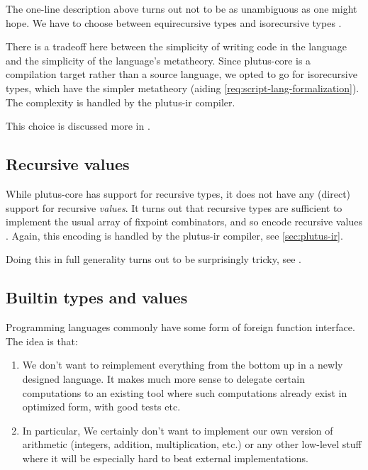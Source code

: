 The one-line description above turns out not to be as unambiguous as one might hope. We have
to choose between equirecursive types and isorecursive types \autocite[chapter 21]{pierce2002types}.

There is a tradeoff here between the simplicity of writing code in the language and the simplicity of the language's metatheory.
Since \gls{plutus-core} is a compilation target rather than a source language, we opted to go for isorecursive types, which have the simpler metatheory (aiding \cref{req:script-lang-formalization}).
The complexity is handled by the \gls{plutus-ir} compiler.

This choice is discussed more in \textcite{plutus-core-spec, peytonjones2019unraveling}.

\subsection{Recursive values}

While \gls{plutus-core} has support for recursive types, it does not have any (direct) support for recursive \emph{values}.
It turns out that recursive types are sufficient to implement the usual array of fixpoint combinators, and so encode recursive values \autocite{harper2012practical}.
Again, this encoding is handled by the \gls{plutus-ir} compiler, see \cref{sec:plutus-ir}.

Doing this in full generality turns out to be surprisingly tricky, see \textcite{peytonjones2019unraveling}.

\subsection{Builtin types and values}

Programming languages commonly have some form of foreign function interface. The idea is that:

\begin{enumerate}
\item
  We don't want to reimplement everything from the bottom up in a newly designed language.
  It makes much more sense to delegate certain computations to an existing tool where such computations already exist in optimized form, with good tests etc.
\item
  In particular, We certainly don't want to implement our own version of arithmetic (integers, addition, multiplication, etc.) or any other low-level stuff where it will be especially hard to beat external implementations.
\end{enumerate}

